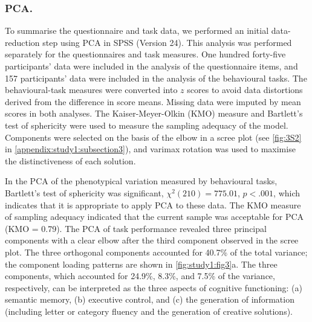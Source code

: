 \subsubsection{PCA.}
To summarise the questionnaire and task data, we performed an initial data-reduction step using PCA in SPSS (Version 24). This analysis was performed separately for the questionnaires and task measures. One hundred forty-five participants' data were included in the analysis of the questionnaire items, and 157 participants' data were included in the analysis of the behavioural tasks. The behavioural-task measures were converted into \(\mathit{z}\) scores to avoid data distortions derived from the difference in score means. Missing data were imputed by mean scores in both analyses. The Kaiser-Meyer-Olkin (KMO) measure and Bartlett's test of sphericity were used to measure the sampling adequacy of the model. Components were selected on the basis of the elbow in a scree plot (see \cref{fig:3S2} in \cref{appendix:study1:subsection3}), and varimax rotation was used to maximise the distinctiveness of each solution.

In the PCA of the phenotypical variation measured by behavioural tasks, Bartlett's test of sphericity was significant,
\(\chi^{2}(210) = 775.01\),
\(\mathit{p} < .001\),
which indicates that it is appropriate to apply PCA to these data. The KMO measure of sampling adequacy indicated that the current sample was acceptable for PCA (KMO = 0.79). The PCA of task performance revealed three principal components with a clear elbow after the third component observed in the scree plot. The three orthogonal components accounted for 40.7\% of the total variance; the component loading patterns are shown in \cref{fig:study1:fig3}a. The three components, which accounted for 24.9\%, 8.3\%, and 7.5\% of the variance, respectively, can be interpreted as the three aspects of cognitive functioning: (a) semantic memory, (b) executive control, and (c) the generation of information (including letter or category fluency and the generation of creative solutions).

